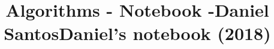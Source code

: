 \documentclass[pt]{extarticle}
\title{\vspace{-4ex}\Large{Algorithms - Notebook -Daniel Santos}}
\title{\vspace{-4ex}\Large{Daniel's notebook (2018)}}
\author{}
\date{}
\begin{document}
\begin{landscape}
\begin{multicols}{2}

\maketitle
\vspace{-13ex}
\tableofcontents
\pagestyle{fancy}



\end{multicols}
\end{landscape}
\end{document}
